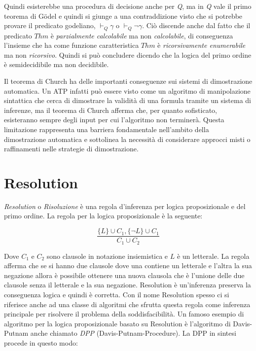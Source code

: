 \documentclass[./main.tex]{subfiles}
\begin{document}
Quindi esisterebbe una procedura di decisione anche per \textit{Q},
ma in \textit{Q} vale il primo teorema di Gödel e quindi si giunge a una contraddizione visto che 
si potrebbe provare il predicato godeliano, $\vdash_{Q} \gamma$ o $\vdash_Q \lnot\gamma$.
Ciò discende anche dal fatto che il predicato $Thm$ è \textit{parzialmente calcolabile} ma non \textit{calcolabile},
di conseguenza l'insieme che ha come funzione caratteristica $Thm$ è \textit{ricorsivamente enumerabile} ma non \textit{ricorsivo}.
Quindi si può concludere dicendo che la logica del primo ordine è semidecidibile ma non decidibile.


Il teorema di Church ha delle importanti conseguenze sui sistemi di dimostrazione automatica.
Un ATP infatti può essere visto come un algoritmo di manipolazione sintattica che cerca di dimostrare la validità di una formula
tramite un sistema di inferenze,
ma il teorema di Church afferma che, per quanto sofisticato, esisteranno sempre degli input per cui l'algoritmo non terminerà.
Questa limitazione rappresenta una barriera fondamentale nell'ambito della dimostrazione automatica 
e sottolinea la necessità di considerare approcci misti o raffinamenti nelle strategie di dimostrazione.

\section{Resolution} \label{sec:resolution}
\textit{Resolution} o \textit{Risoluzione} è una regola d'inferenza per logica proposizionale e del primo ordine.
La regola per la logica proposizionale è la seguente:

$$ \frac{\{L\} \cup C_1, \{\lnot L\} \cup C_1}{C_1 \cup C_2} $$

Dove $C_1$ e $C_2$ sono clausole in notazione insiemistica e $L$ è un letterale. 
La regola afferma che se si hanno due clausole dove una contiene un letterale e l'altra la sua negazione allora è possibile
ottenere una nuova clausola che è l'unione delle due clausole senza il letterale e la sua negazione.
Resolution è un'inferenza preserva la conseguenza logica e quindi è corretta. 
Con il nome Resolution spesso ci si riferisce anche ad una classe di algoritmi che sfrutta questa regola come inferenza principale 
per risolvere il problema della soddisfacibilità.
Un famoso esempio di algoritmo per la logica proposizionale basato su Resolution è l'algoritmo di Davis-Putnam anche chiamato \textit{DPP} (Davis-Putnam-Procedure).
La DPP in sintesi procede in questo modo:
\end{document}
